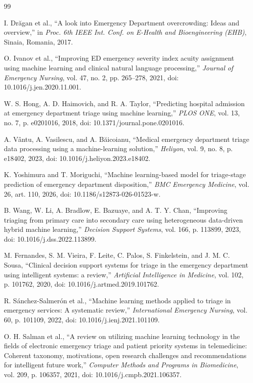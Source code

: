 \documentclass[11pt]{article}
\begin{document}
\begin{thebibliography}{99}

I. Drăgan et al., ``A look into Emergency Department overcrowding: Ideas and overview,'' in \emph{Proc. 6th IEEE Int. Conf. on E-Health and Bioengineering (EHB)}, Sinaia, Romania, 2017.

O. Ivanov et al., ``Improving ED emergency severity index acuity assignment using machine learning and clinical natural language processing,'' \emph{Journal of Emergency Nursing}, vol. 47, no. 2, pp. 265--278, 2021, doi: 10.1016/j.jen.2020.11.001.

W. S. Hong, A. D. Haimovich, and R. A. Taylor, ``Predicting hospital admission at emergency department triage using machine learning,'' \emph{PLOS ONE}, vol. 13, no. 7, p. e0201016, 2018, doi: 10.1371/journal.pone.0201016.

A. Vântu, A. Vasilescu, and A. Băicoianu, ``Medical emergency department triage data processing using a machine-learning solution,'' \emph{Heliyon}, vol. 9, no. 8, p. e18402, 2023, doi: 10.1016/j.heliyon.2023.e18402.

K. Yoshimura and T. Moriguchi, ``Machine learning-based model for triage-stage prediction of emergency department disposition,'' \emph{BMC Emergency Medicine}, vol. 26, art. 110, 2026, doi: 10.1186/s12873-026-01523-w.

B. Wang, W. Li, A. Bradlow, E. Bazuaye, and A. T. Y. Chan, ``Improving triaging from primary care into secondary care using heterogeneous data-driven hybrid machine learning,'' \emph{Decision Support Systems}, vol. 166, p. 113899, 2023, doi: 10.1016/j.dss.2022.113899.

M. Fernandes, S. M. Vieira, F. Leite, C. Palos, S. Finkelstein, and J. M. C. Sousa, ``Clinical decision support systems for triage in the emergency department using intelligent systems: a review,'' \emph{Artificial Intelligence in Medicine}, vol. 102, p. 101762, 2020, doi: 10.1016/j.artmed.2019.101762.

R. Sánchez-Salmerón et al., ``Machine learning methods applied to triage in emergency services: A systematic review,'' \emph{International Emergency Nursing}, vol. 60, p. 101109, 2022, doi: 10.1016/j.ienj.2021.101109.

O. H. Salman et al., ``A review on utilizing machine learning technology in the fields of electronic emergency triage and patient priority systems in telemedicine: Coherent taxonomy, motivations, open research challenges and recommendations for intelligent future work,'' \emph{Computer Methods and Programs in Biomedicine}, vol. 209, p. 106357, 2021, doi: 10.1016/j.cmpb.2021.106357.


\end{thebibliography}
\end{document}
